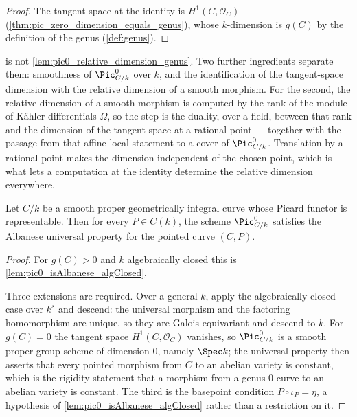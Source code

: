 \begin{proof}
  The tangent space at the identity is \(H^1(C,\mathcal O_C)\)
  (\cref{thm:pic_zero_dimension_equals_genus}), whose \(k\)-dimension is \(g(C)\) by
  the definition of the genus (\cref{def:genus}).
\end{proof}

\begin{remark}
  \label{rem:tangent_versus_relative_dimension}
   is not
  \cref{lem:pic0_relative_dimension_genus}. Two further ingredients separate them:
  smoothness of \(\Pic^0_{C/k}\) over \(k\), and the identification of the
  tangent-space dimension with the relative dimension of a smooth morphism. For the
  second, the relative dimension of a smooth morphism is computed by the rank of the
  module of Kähler differentials \(\Omega\), so the step is the duality, over a field,
  between that rank and the dimension of the tangent space at a rational point ---
  together with the passage from that affine-local statement to a cover of
  \(\Pic^0_{C/k}\). Translation by a rational point makes the dimension independent of
  the chosen point, which is what lets a computation at the identity determine the
  relative dimension everywhere.
\end{remark}

\begin{lemma}
  \label{lem:pic0_isAlbanese_all_points}
  Let \(C/k\) be a smooth proper geometrically integral curve whose Picard functor
  is representable. Then for every \(P\in C(k)\), the scheme \(\Pic^0_{C/k}\)
  satisfies the Albanese universal property for the pointed curve \((C,P)\).
\end{lemma}

\begin{proof}
  For \(g(C) > 0\) and \(k\) algebraically closed this is
  \cref{lem:pic0_isAlbanese_algClosed}.

  Three extensions are required. Over a general \(k\), apply the algebraically
  closed case over \(k^s\) and descend: the universal morphism and the factoring
  homomorphism are unique, so they are Galois-equivariant and descend to \(k\).
  For \(g(C) = 0\) the tangent space \(H^1(C,\mathcal O_C)\) vanishes, so
  \(\Pic^0_{C/k}\) is a smooth proper group scheme of dimension \(0\), namely
  \(\Spec k\); the universal property then asserts that every pointed morphism
  from \(C\) to an abelian variety is constant, which is the rigidity statement
  that a morphism from a genus-\(0\) curve to an abelian variety is constant.
  The third is the basepoint condition \(P \circ \iota_P = \eta\), a hypothesis
  of \cref{lem:pic0_isAlbanese_algClosed} rather than a restriction on it.
\end{proof}


